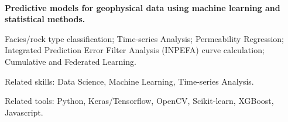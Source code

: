\\
\vspace{-.2em}
\begin{xitemize}
    \item \textbf{Predictive models for geophysical data using machine learning and statistical methods.}
    \begin{zitemize}
        \item Facies/rock type classification; Time-series Analysis; Permeability Regression; Integrated Prediction Error Filter Analysis (INPEFA) curve calculation; Cumulative and Federated Learning.
        \item Related skills: Data Science, Machine Learning, Time-series Analysis.
        \item Related tools: Python, Keras/Tensorflow, OpenCV, Scikit-learn, XGBoost, Javascript.
    \end{zitemize}
\end{xitemize}